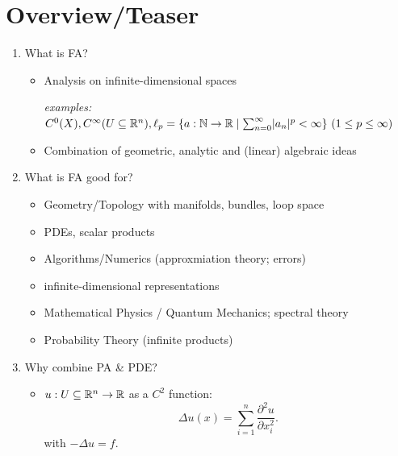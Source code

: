 \documentclass[language=english]{../../Template/TemplateLecture}
\begin{document}

\chapter{Overview/Teaser}


\begin{enumerate}
    \item What is FA?
    \begin{itemize}
        \item Analysis on infinite-dimensional spaces

        \emph{examples:} $C^0(X), C^\infty(U \subseteq \mathbb{R}^n), \ell_p = \{a: \mathbb{N} \to \mathbb{R} \mid \sum_{n = 0}^\infty \lvert a_n\rvert^p < \infty\} ~(1 \leq p \leq \infty)$
        \item Combination of geometric, analytic and (linear) algebraic ideas
    \end{itemize}
    \item What is FA good for?
    \begin{itemize}
        \item Geometry/Topology with manifolds, bundles, loop space
        \item PDEs, scalar products
        \item Algorithms/Numerics (approxmiation theory; errors)
        \item infinite-dimensional representations
        \item Mathematical Physics / Quantum Mechanics; spectral theory
        \item Probability Theory (infinite products)
    \end{itemize}
    \item Why combine PA \& PDE?
    \begin{itemize}
        \item $u: U \subseteq \mathbb{R}^n \to \mathbb{R}$ as a $C^2$ function:
        \begin{equation}
            \Delta u(x) = \sum_{i = 1}^n \frac{\partial^2 u}{\partial x_i^2}.
        \end{equation}
        with $-\Delta u = f$.


\end{itemize}
\end{enumerate}
\end{document}
